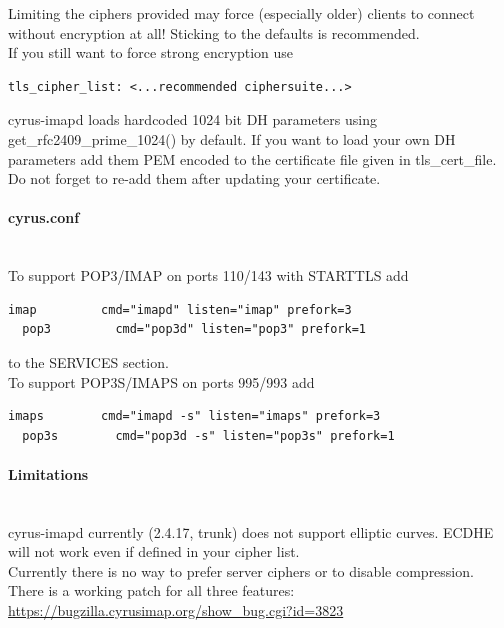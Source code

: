 Limiting the ciphers provided may force (especially older) clients to connect without encryption at all! Sticking to the defaults is recommended.\\

If you still want to force strong encryption use
\begin{lstlisting}[breaklines]
  tls_cipher_list: <...recommended ciphersuite...>
\end{lstlisting}

cyrus-imapd loads hardcoded 1024 bit DH parameters using get\_rfc2409\_prime\_1024() by default. If you want to load your own DH parameters add them PEM encoded to the certificate file given in tls\_cert\_file. Do not forget to re-add them after updating your certificate.

\paragraph*{cyrus.conf}\mbox{}\\

To support POP3/IMAP on ports 110/143 with STARTTLS add
\begin{lstlisting}[breaklines]
  imap         cmd="imapd" listen="imap" prefork=3
  pop3         cmd="pop3d" listen="pop3" prefork=1
\end{lstlisting}
to the SERVICES section.\\

To support POP3S/IMAPS on ports 995/993 add
\begin{lstlisting}[breaklines]
  imaps        cmd="imapd -s" listen="imaps" prefork=3
  pop3s        cmd="pop3d -s" listen="pop3s" prefork=1
\end{lstlisting}

\paragraph*{Limitations}\mbox{}\\

cyrus-imapd currently (2.4.17, trunk) does not support elliptic curves. ECDHE will not work even if defined in your cipher list.\\

Currently there is no way to prefer server ciphers or to disable compression.\\

There is a working patch for all three features:
\url{https://bugzilla.cyrusimap.org/show_bug.cgi?id=3823}\\


